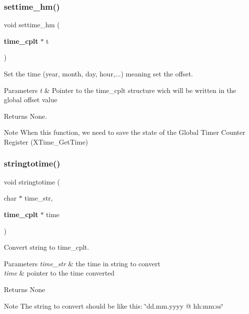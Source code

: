 \subsubsection{settime\_hm()}
{\footnotesize\ttfamily void settime\+\_\+hm (\begin{DoxyParamCaption}\item[{\textbf{ time\+\_\+cplt} $\ast$}]{t }\end{DoxyParamCaption})}



Set the time (year, month, day, hour,...) meaning set the offset. 


\begin{DoxyParams}{Parameters}
{\em t} & Pointer to the time\+\_\+cplt structure wich will be written in the global offset value\\
\hline
\end{DoxyParams}
\begin{DoxyReturn}{Returns}
None.
\end{DoxyReturn}
\begin{DoxyNote}{Note}
When this function, we need to save the state of the Global Timer Counter Register (X\+Time\+\_\+\+Get\+Time) 
\end{DoxyNote}
\mbox{\label{time__hm_8c_aea8453e6247ec2872c89e25b17284666}} 
\subsubsection{stringtotime()}
{\footnotesize\ttfamily void stringtotime (\begin{DoxyParamCaption}\item[{char $\ast$}]{time\+\_\+str,  }\item[{\textbf{ time\+\_\+cplt} $\ast$}]{time }\end{DoxyParamCaption})}



Convert string to time\+\_\+cplt. 


\begin{DoxyParams}{Parameters}
{\em time\+\_\+str} & the time in string to convert \\
\hline
{\em time} & pointer to the time converted\\
\hline
\end{DoxyParams}
\begin{DoxyReturn}{Returns}
None
\end{DoxyReturn}
\begin{DoxyNote}{Note}
The string to convert should be like this\+: \char`\"{}dd.\+mm.\+yyyy @ hh\+:mm\+:ss\char`\"{} 
\end{DoxyNote}



